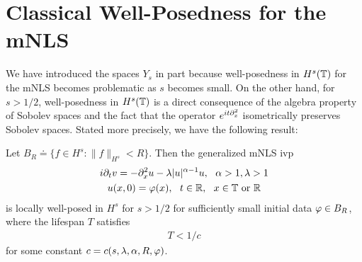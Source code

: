 \section{Classical Well-Posedness for the mNLS}
%
%
%
%
%
%
%
%
%
%
We have introduced the spaces $Y_s$ in part because well-posedness
in $H^s(\mathbb{T})$ for the mNLS becomes problematic as $s$ becomes small. 
On the other hand, for $s > 1/2$, well-posedness in $H^s(\mathbb{T})$ is a direct 
consequence of the algebra property of Sobolev spaces and the fact that the operator 
$e^{it \partial_x^2}$ isometrically preserves Sobolev spaces. Stated more 
precisely, we have the following result:
%
%
\begin{proposition}
  Let $B_R \doteq \{f \in H^s : \|f\|_{H^s} < R \}$.
  Then the generalized mNLS ivp
\begin{gather}
  \label{general-mNLS-eq}
    i \partial_t v = - \partial_x^2 u - \lambda |u|^{\alpha -1} u, \ \ \alpha > 
    1, \lambda > 1
    \\
    \label{general-mNLS-init-data}
    u(x,0) = \varphi(x), \ \ t \in \mathbb{R}, \ \ x \in \mathbb{T} \ \text{or} \ \mathbb{R}
\end{gather}
  is locally well-posed in $H^s$ for $s > 1/2$ for 
  sufficiently small initial data $\varphi \in B_R$, where the lifespan $T$ 
  satisfies 
%
%
\begin{equation*}
  \begin{split}
    T < 1/c
  \end{split}
\end{equation*}
%
%
for some constant $c = c(s, \lambda, \alpha, R, \varphi)$.
\end{proposition}
%
%

